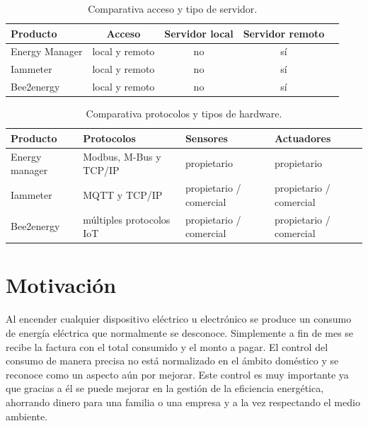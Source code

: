 
\begin{table}[h]
	\centering
	\caption[Comparativa de soluciones entre acceso y servidor]{Comparativa acceso y tipo de servidor.}
	\begin{tabular}{l c c c c }    
		\toprule
		\textbf{Producto} & \textbf{Acceso} & \textbf{Servidor  local}   & \textbf{Servidor remoto} \\
		\midrule
		Energy Manager & local y remoto 	& no & sí  \\		
		Iammeter	 & local y remoto	& no & sí  \\
		Bee2energy	 & local y remoto	& no & sí  \\
		\bottomrule
		\hline
	\end{tabular}
	\label{tab:tabla2}
\end{table}

\vspace{1cm}



\begin{table}[h]
	\centering
	\caption[Comparativa de soluciones entre protocolos y hardware]{Comparativa protocolos y tipos de hardware.}
	\begin{tabular}{l p{3cm} p{2cm} p{2cm}}    
		\toprule
		\textbf{Producto} 	 & \textbf{Protocolos}  & \textbf{ Sensores} & \textbf{Actuadores}  \\
		\midrule
		Energy manager & Modbus, M-Bus  y TCP/IP 	& propietario & propietario \\		
		Iammeter	 & MQTT y TCP/IP	& propietario / comercial & propietario / comercial \\
		Bee2energy	 & múltiples protocolos IoT		& propietario / comercial & propietario / comercial\\
		\bottomrule
		\hline
	\end{tabular}
	\label{tab:tabla3}
\end{table}






\section{Motivación}
Al encender cualquier dispositivo eléctrico u electrónico se produce un consumo de energía eléctrica que normalmente se desconoce. Simplemente a fin de mes se recibe la factura con el total consumido y el monto a pagar. El control del consumo de manera precisa no está normalizado en el ámbito doméstico y se reconoce como un aspecto aún por mejorar. Este control es muy importante ya que gracias a él se puede mejorar en la gestión de la eficiencia energética, ahorrando dinero para una familia o una empresa y a la vez respectando el medio ambiente.

